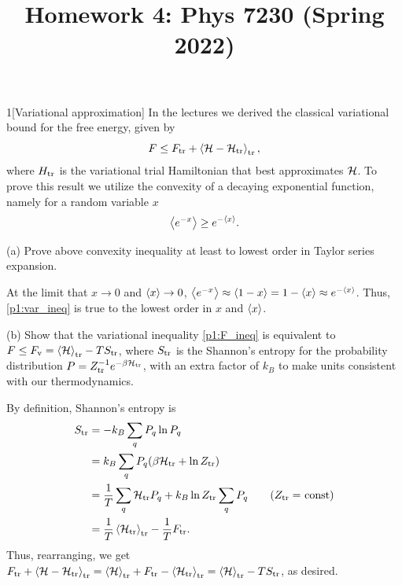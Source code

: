 \documentclass[12pt]{article}
\title{Homework 4: Phys 7230 (Spring 2022)}
\begin{document}
\maketitle
\begin{problem}{1}[Variational approximation]
In the lectures we derived the classical variational bound for the free energy,
given by
\begin{equation}\label{p1:F_ineq}
    F\leq F_{\text{tr}}+\expval{\mathcal{H}-\mathcal{H}_{\text{tr}}}_{\text{tr}}, 
\end{equation}
where $H_{\text{tr}}$ is the variational trial Hamiltonian that best approximates
$\mathcal{H}$. To prove this result we utilize the convexity of a decaying exponential
function, namely for a random variable $x$
\begin{equation}\label{p1:var_ineq}
    \expval{e^{-x}}\geq e^{-\expval{x}}. 
\end{equation}

(a) Prove above convexity inequality at least to lowest order in Taylor series
expansion.
\begin{solution}
At the limit that $x\to 0$ and $\expval{x}\to0$,
$\expval{e^{-x}}\approx\expval{1-x}=1-\expval{x}\approx e^{-\expval{x}}$. Thus,
\eqref{p1:var_ineq} is true to the lowest order in $x$ and $\expval{x}$.
\end{solution}

(b) Show that the variational inequality \eqref{p1:F_ineq} is equivalent to
$F\leq F_{\text{v}}=\expval{\mathcal{H}}_{\text{tr}}-TS_{\text{tr}}$, where $S_{\text{tr}}$ is the Shannon's
entropy for the probability distribution $P=Z_{\text{tr}}^{-1}e^{-\beta\mathcal{H}_{\text{tr}}}$,
with an extra factor of $k_B$ to make units consistent with our thermodynamics.
\begin{solution}
    By definition, Shannon's entropy is
\begin{align}
    S_\t{tr}
    &=-k_B\sum_q P_q\ln P_q\notag\\
    &=k_B\sum_qP_q\qty(\beta\HH_\t{tr}+\ln Z_\t{tr})\notag\\
    &=\frac1T\sum_q\HH_\t{tr}P_q+k_B\ln Z_\t{tr}\sum_q P_q\tag{$Z_\t{tr}=$
    const}\\
    &=\frac1T\expval{\HH_\t{tr}}_\t{tr}-\frac1TF_\t{tr}.
\end{align}
Thus, rearranging, we get $F_{\text{tr}}+\expval{\mathcal{H}-\mathcal{H}_{\text{tr}}}_{\text{tr}}
=\expval{\mathcal{H}}_{\text{tr}}+F_{\text{tr}}-\expval{\mathcal{H}_{\text{tr}}}_{\text{tr}}
=\expval{\mathcal{H}}_{\text{tr}}-TS_{\text{tr}}$, as desired.
\end{solution}


\end{problem}
\end{document}
